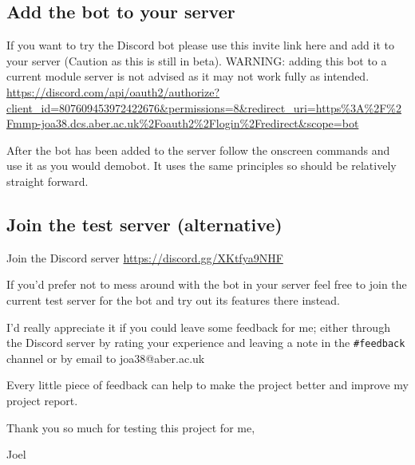 \hypertarget{add-the-bot-to-your-server}{%
\subsection{Add the bot to your
server}\label{add-the-bot-to-your-server}}

If you want to try the Discord bot please use this invite link here and
add it to your server (Caution as this is still in beta). WARNING:
adding this bot to a current module server is not advised as it may not
work fully as intended.
\url{https://discord.com/api/oauth2/authorize?client_id=807609453972422676\&permissions=8\&redirect_uri=https\%3A\%2F\%2Fmmp-joa38.dcs.aber.ac.uk\%2Foauth2\%2Flogin\%2Fredirect\&scope=bot}

After the bot has been added to the server follow the onscreen commands
and use it as you would demobot. It uses the same principles so should
be relatively straight forward.

\hypertarget{join-the-test-server-alternative}{%
\subsection{Join the test server
(alternative)}\label{join-the-test-server-alternative}}

Join the Discord server \url{https://discord.gg/XKtfya9NHF}

If you'd prefer not to mess around with the bot in your server feel free
to join the current test server for the bot and try out its features
there instead.

I'd really appreciate it if you could leave some feedback for me; either
through the Discord server by rating your experience and leaving a note
in the \texttt{\#feedback} channel or by email to joa38@aber.ac.uk

Every little piece of feedback can help to make the project better and
improve my project report.

Thank you so much for testing this project for me,

Joel